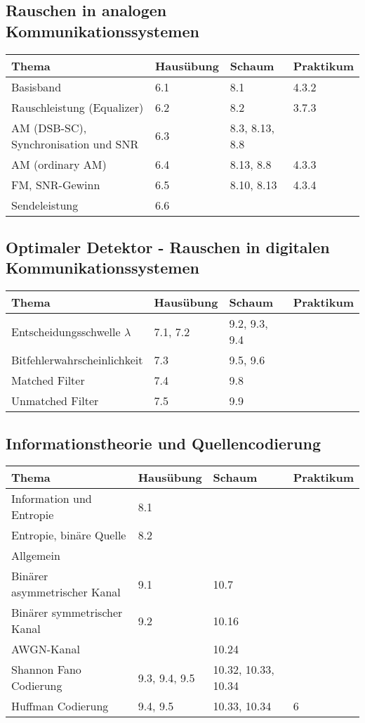 \subsection{Rauschen in analogen Kommunikationssystemen}
	\begin{tabular}{|p{9cm}|p{2.5cm}|p{3.5cm}|p{2cm}|}
	\hline
	\textbf{Thema} & \textbf{Hausübung} & \textbf{Schaum} & \textbf{Praktikum} \\ 
	\hline
	\hline
	Basisband & 6.1 & 8.1 & 4.3.2\\
	\hline
	Rauschleistung (Equalizer) & 6.2 & 8.2 & 3.7.3\\
	\hline
	AM (DSB-SC), Synchronisation und SNR & 6.3 & 8.3, 8.13, 8.8 & \\
	\hline
	AM (ordinary AM) & 6.4 & 8.13, 8.8 & 4.3.3\\
	\hline
	FM, SNR-Gewinn & 6.5 & 8.10, 8.13 & 4.3.4\\
	\hline
	Sendeleistung & 6.6 & & \\
	\hline
	\end{tabular}
\subsection{Optimaler Detektor - Rauschen in digitalen Kommunikationssystemen}
	\begin{tabular}{|p{9cm}|p{2.5cm}|p{3.5cm}|p{2cm}|}
	\hline
	\textbf{Thema} & \textbf{Hausübung} & \textbf{Schaum} & \textbf{Praktikum} \\ 
	\hline
	\hline
	Entscheidungsschwelle $\lambda$ & 7.1, 7.2 & 9.2, 9.3, 9.4 & \\
	\hline
	Bitfehlerwahrscheinlichkeit & 7.3 & 9.5, 9.6 & \\
	\hline
	Matched Filter & 7.4 & 9.8 &\\
	\hline
	Unmatched Filter & 7.5 & 9.9 & \\
	\hline
	\end{tabular}
\subsection{Informationstheorie und Quellencodierung}
	\begin{tabular}{|p{9cm}|p{2.5cm}|p{3.5cm}|p{2cm}|}
	\hline
	\textbf{Thema} & \textbf{Hausübung} & \textbf{Schaum} & \textbf{Praktikum} \\ 
	\hline
	\hline
	Information und Entropie & 8.1 & & \\
	\hline
	Entropie, binäre Quelle & 8.2 & & \\
	\hline
	Allgemein & & &\\
	\hline
	Binärer asymmetrischer Kanal & 9.1 & 10.7 & \\
	\hline
	Binärer symmetrischer Kanal & 9.2 & 10.16 & \\
	\hline
	AWGN-Kanal &  & 10.24 & \\
	\hline
	Shannon Fano Codierung & 9.3, 9.4, 9.5 & 10.32, 10.33, 10.34 & \\
	\hline
	Huffman Codierung & 9.4, 9.5 & 10.33, 10.34 & 6\\
	\hline
	\end{tabular}
